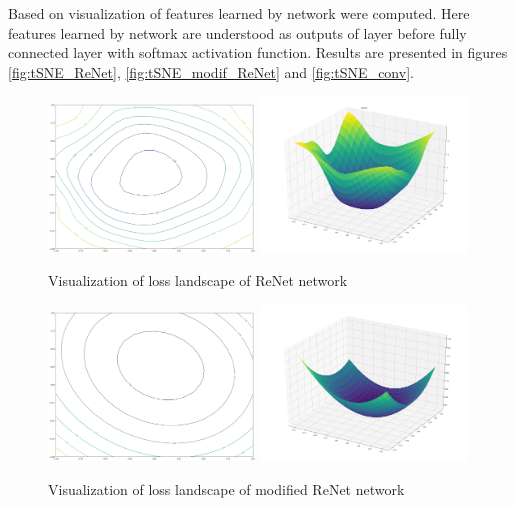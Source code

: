 \documentclass[a4paper, 10 pt, conference]{ieeeconf}
\begin{document}
Based on \cite{tSNE} visualization of features learned by network were computed. Here features learned by network are understood as outputs of layer before fully connected layer with softmax activation function. Results are presented in figures \ref{fig:tSNE_ReNet}, \ref{fig:tSNE_modif_ReNet} and \ref{fig:tSNE_conv}.

\begin{figure}
\centering
	\includegraphics[width=0.49\textwidth]{img/loss_ReNet.png}
	\includegraphics[width=0.49\textwidth]{img/loss_3d_ReNet.png}
	\caption{Visualization of loss landscape of ReNet network}
	\label{fig:loss_ReNet}
\end{figure}

\begin{figure}
\centering
	\includegraphics[width=0.49\textwidth]{img/loss_modif_ReNet.png}
	\includegraphics[width=0.49\textwidth]{img/loss_3d_modif_ReNet.png}
	\caption{Visualization of loss landscape of modified ReNet network}
	\label{fig:loss_modif_ReNet}
\end{figure}
\end{document}
